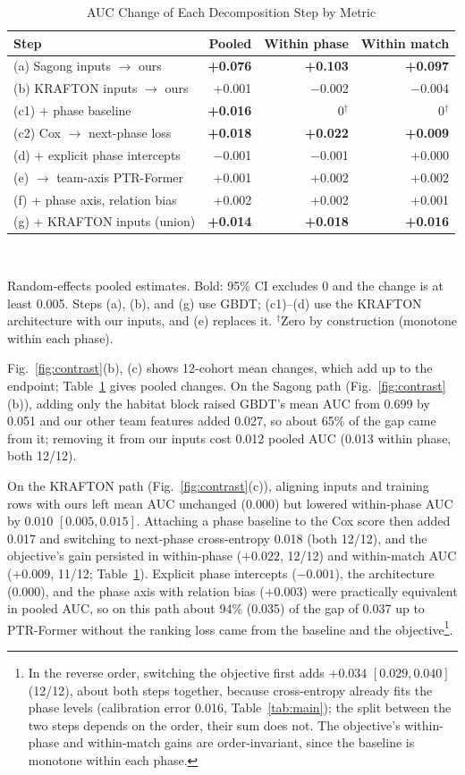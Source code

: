 \documentclass[conference]{IEEEtran}
\begin{document}
\begin{table}[t]
\centering
\caption{AUC Change of Each Decomposition Step by Metric}
\label{tab:steps}
\footnotesize
\setlength{\tabcolsep}{3.5pt}
\begin{tabular}{lrrr}
\hline
Step & Pooled & Within phase & Within match \\
\hline
(a) Sagong inputs $\to$ ours & \textbf{+0.076} & \textbf{+0.103} & \textbf{+0.097} \\
(b) KRAFTON inputs $\to$ ours & +0.001 & $-$0.002 & $-$0.004 \\
(c1) + phase baseline & \textbf{+0.016} & 0$^\dagger$ & 0$^\dagger$ \\
(c2) Cox $\to$ next-phase loss & \textbf{+0.018} & \textbf{+0.022} & \textbf{+0.009} \\
(d) + explicit phase intercepts & $-$0.001 & $-$0.001 & +0.000 \\
(e) $\to$ team-axis PTR-Former & +0.001 & +0.002 & +0.002 \\
(f) + phase axis, relation bias & +0.002 & +0.002 & +0.001 \\
(g) + KRAFTON inputs (union) & \textbf{+0.014} & \textbf{+0.018} & \textbf{+0.016} \\
\hline
\end{tabular}
\\[2pt]
\parbox{\columnwidth}{\scriptsize Random-effects pooled estimates. Bold: 95\% CI excludes 0 and the change is at least 0.005. Steps (a), (b), and (g) use GBDT; (c1)--(d) use the KRAFTON architecture with our inputs, and (e) replaces it. $^\dagger$Zero by construction (monotone within each phase).}
\end{table}
Fig.~\ref{fig:contrast}(b), (c) shows 12-cohort mean changes, which add up to the endpoint; Table~\ref{tab:steps} gives pooled changes.
On the Sagong path (Fig.~\ref{fig:contrast}(b)), adding only the habitat block raised GBDT's mean AUC from 0.699 by 0.051 and our other team features added 0.027, so about 65\% of the gap came from it; removing it from our inputs cost 0.012 pooled AUC (0.013 within phase, both 12/12).

On the KRAFTON path (Fig.~\ref{fig:contrast}(c)), aligning inputs and training rows with ours left mean AUC unchanged (0.000) but lowered within-phase AUC by $0.010$ $[0.005, 0.015]$.
Attaching a phase baseline to the Cox score then added 0.017 and switching to next-phase cross-entropy 0.018 (both 12/12), and the objective's gain persisted in within-phase ($+0.022$, 12/12) and within-match AUC ($+0.009$, 11/12; Table~\ref{tab:steps}).
Explicit phase intercepts ($-0.001$), the architecture (0.000), and the phase axis with relation bias ($+0.003$) were practically equivalent in pooled AUC, so on this path about 94\% (0.035) of the gap of 0.037 up to PTR-Former without the ranking loss came from the baseline and the objective\footnote{In the reverse order, switching the objective first adds $+0.034$ $[0.029, 0.040]$ (12/12), about both steps together, because cross-entropy already fits the phase levels (calibration error 0.016, Table~\ref{tab:main}); the split between the two steps depends on the order, their sum does not. The objective's within-phase and within-match gains are order-invariant, since the baseline is monotone within each phase.}.
\end{document}
